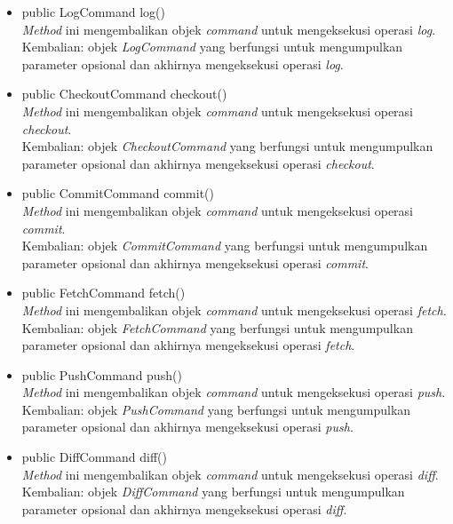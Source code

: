 \documentclass[a4paper,twoside]{article}
\begin{document}
\begin{enumerate}
\begin{itemize}
\item public LogCommand log()\\
\textit{Method} ini mengembalikan objek \textit{command} untuk mengeksekusi operasi \textit{log}.\\
Kembalian: objek \textit{LogCommand} yang berfungsi untuk mengumpulkan parameter opsional dan akhirnya mengeksekusi operasi \textit{log}.

\item public CheckoutCommand checkout()\\
\textit{Method} ini mengembalikan objek \textit{command} untuk mengeksekusi operasi \textit{checkout}.\\
Kembalian: objek \textit{CheckoutCommand} yang berfungsi untuk mengumpulkan parameter opsional dan akhirnya mengeksekusi operasi \textit{checkout}.

\item public CommitCommand commit()\\
\textit{Method} ini mengembalikan objek \textit{command} untuk mengeksekusi operasi \textit{commit}.\\
Kembalian: objek \textit{CommitCommand} yang berfungsi untuk mengumpulkan parameter opsional dan akhirnya mengeksekusi operasi \textit{commit}.

\item public FetchCommand fetch()\\
\textit{Method} ini mengembalikan objek \textit{command} untuk mengeksekusi operasi \textit{fetch}.\\
Kembalian: objek \textit{FetchCommand} yang berfungsi untuk mengumpulkan parameter opsional dan akhirnya mengeksekusi operasi \textit{fetch}.

\item public PushCommand push()\\
\textit{Method} ini mengembalikan objek \textit{command} untuk mengeksekusi operasi \textit{push}.\\
Kembalian: objek \textit{PushCommand} yang berfungsi untuk mengumpulkan parameter opsional dan akhirnya mengeksekusi operasi \textit{push}.

\item public DiffCommand diff()\\
\textit{Method} ini mengembalikan objek \textit{command} untuk mengeksekusi operasi \textit{diff}.\\
Kembalian: objek \textit{DiffCommand} yang berfungsi untuk mengumpulkan parameter opsional dan akhirnya mengeksekusi operasi \textit{diff}.


\end{itemize}
\end{enumerate}
\end{document}
